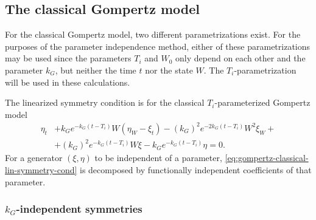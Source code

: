 \subsection{The classical Gompertz model}

For the classical Gompertz model, two different parametrizations exist.
For the purposes of the parameter independence method, either of these parametrizations may be used since the parameters \(T_i\) and \(W_0\) only depend on each other and the parameter \(k_G\), but neither the time \(t\) nor the state \(W\).
The \(T_i\)-parametrization will be used in these calculations.

The linearized symmetry condition  is for the classical \(T_i\)-parameterized Gompertz model
\begin{equation}\label{eq:gompertz-classical-lin-symmetry-cond}
  \begin{split}
    \eta_t &+ k_G e^{-k_G (t - T_i)} W\left(\eta_W - \xi_t\right) - (k_G)^2 e^{-2k_G (t - T_i)} W^2 \xi_W +\\ &+ (k_G)^2 e^{-k_G (t - T_i)} W \xi - k_G e^{-k_G (t - T_i)} \eta = 0.
  \end{split}
\end{equation}
For a generator \(\left(\xi, \eta\right)\) to be independent of a parameter, \cref{eq:gompertz-classical-lin-symmetry-cond} is decomposed by functionally independent coefficients of that parameter.

\subsubsection{\texorpdfstring{\(k_G\)-independent symmetries}{Growth rate-independent symmetries}}

